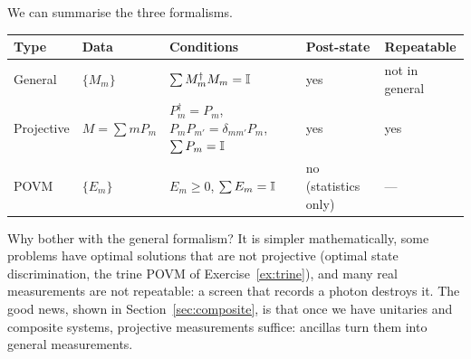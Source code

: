 We can summarise the three formalisms.
\begin{center}
\small
\begin{tabular}{@{}>{\raggedright\arraybackslash}p{}>{\raggedright\arraybackslash}p{}>{\raggedright\arraybackslash}p{}>{\raggedright\arraybackslash}p{}>{\raggedright\arraybackslash}p{}@{}}
  \toprule
  Type & Data & Conditions & Post-state & Repeatable\\
  \midrule
  General & $\{M_m\}$ & $\sum M_m^\dagger M_m=\mathbb{I}$ & yes & not in general\\
  Projective & $M=\sum mP_m$ & $P_m^\dagger=P_m$, $P_mP_{m'}=\delta_{mm'}P_m$, $\sum P_m=\mathbb{I}$ & yes & yes\\
  POVM & $\{E_m\}$ & $E_m\ge0$, $\sum E_m=\mathbb{I}$ & no (statistics only) & ---\\
  \bottomrule
\end{tabular}
\end{center}
Why bother with the general formalism? It is simpler mathematically, some problems have optimal solutions that are not projective (optimal state discrimination, the trine POVM of Exercise~\ref{ex:trine}), and many real measurements are not repeatable: a screen that records a photon destroys it.
The good news, shown in Section~\ref{sec:composite}, is that once we have unitaries and composite systems, projective measurements suffice: ancillas turn them into general measurements.


